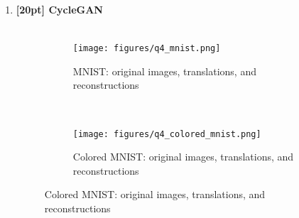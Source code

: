 \documentclass{article}
\begin{document}
\newpage
{}
\begin{enumerate}

\item {\bf [20pt] CycleGAN} \\\\
\begin{figure}[H]
    \centering
    \begin{subfigure}{0.5\textwidth}
        \centering
        \texttt{[image: figures/q4\_mnist.png]}
        \caption{MNIST: original images, translations, and reconstructions}
    \end{subfigure}
    \\
    \begin{subfigure}{0.5\textwidth}
        \centering
        \texttt{[image: figures/q4\_colored\_mnist.png]}
        \caption{Colored MNIST: original images, translations, and reconstructions}
    \end{subfigure}
\end{figure}
\end{enumerate}
\end{document}

